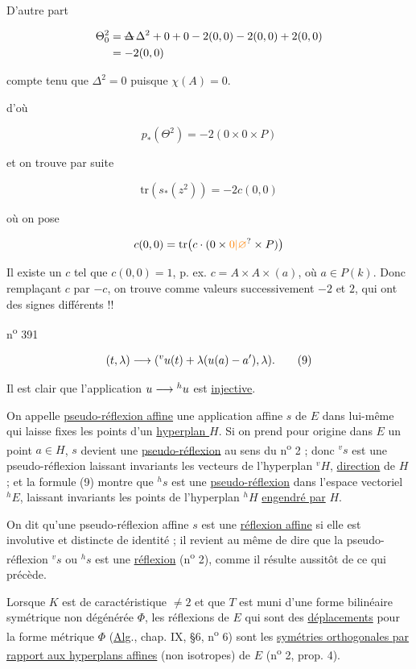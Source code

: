 D'autre part

\[
\begin{aligned}
\Theta_0^2&=\deleted{\Delta}\,\Delta^2+0+0-2(0,0)-2(0,0)+2(0,0)\\
&=-2(0,0)
\end{aligned}
\]

compte tenu que $\Delta^2=0$  puisque $\chi(A)=0$.

d'où

\[
p_*(\Theta^2)=-2(0\times0\times P)
\]

et on trouve par suite

\[
\mathrm{tr}(s_*(z^2))=-2c(0,0)
\]

où on pose

\[
c(0,0)=\mathrm{tr}\bigl(c\cdot(0\times\unsure{0|\varnothing}\times P)\bigr)
\]

Il existe un $c$ tel que $c(0,0)=1$, p. ex. $c=A\times A\times(a)$, où $a\in P(k)$. Donc remplaçant  $c$ par $-c$, on trouve comme valeurs successivement $-2$ et $2$, qui ont des signes différents !!


n\textsuperscript{o} 391

\[
(t,\lambda)\longrightarrow({}^{v}u(t)+\lambda(u(a)-a'),\lambda).\tag*{(9)}
\]

Il est clair que l'application $u\longrightarrow{}^{h}u$ est \uline{injective}.

On appelle \uline{pseudo-réflexion affine} une application affine $s$ de $E$ dans lui-même qui laisse fixes les points d'un \uline{hyperplan } $H$. Si on prend pour origine dans $E$ un point $a\in H$, $s$ devient une \uline{pseudo-réflexion} au sens du n\textsuperscript{o} 2 ; donc $^{v}s$ est une pseudo-réflexion laissant invariants les vecteurs de l'hyperplan $^{v}H$, \uline{direction} de $H$ ; et la formule (9) montre que $^{h}s$ est une \uline{pseudo-réflexion} dans l'espace vectoriel $^{h}E$, laissant invariants les points de l'hyperplan $^{h}H$ \uline{engendré par} $H$.

On dit qu'une pseudo-réflexion affine $s$ est une \uline{réflexion affine} si elle est involutive et distincte de identité ; il revient au même de dire que la pseudo-réflexion $^{v}s$ ou $^{h}s$ est une \uline{réflexion} (n\textsuperscript{o} 2), comme il résulte aussitôt de ce qui précède.

Lorsque $K$ est de caractéristique $\neq2$ et que $T$ est muni d'une forme bilinéaire symétrique non dégénérée $\Phi$, les réflexions de $E$ qui sont des \uline{déplacements} pour la forme métrique $\Phi$ (\uline{Alg}., chap. IX, §6, n\textsuperscript{o} 6) sont les \uline{symétries orthogonales par rapport aux hyperplans affines} (non isotropes) de $E$ (n\textsuperscript{o} 2, prop. 4).

